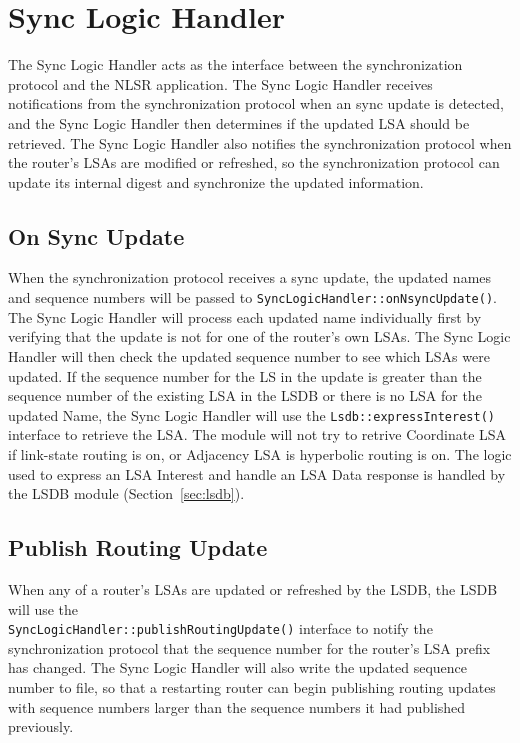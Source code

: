 \section{Sync Logic Handler}
\label{sec:sync-logic}

The Sync Logic Handler acts as the interface between the synchronization protocol and the NLSR application.
The Sync Logic Handler receives notifications from the synchronization protocol when an sync update is detected, and the Sync Logic Handler then determines if the updated LSA should be retrieved.
The Sync Logic Handler also notifies the synchronization protocol when the router's LSAs are modified or refreshed, so the synchronization protocol can update its internal digest and synchronize the updated information.

\subsection{On Sync Update}
When the synchronization protocol receives a sync update, the updated names and sequence numbers will be passed to \texttt{SyncLogicHandler::onNsyncUpdate()}.
The Sync Logic Handler will process each updated name individually first by verifying that the update is not for one of the router's own LSAs.
The Sync Logic Handler will then check the updated sequence number to see which LSAs were updated.
If the sequence number for the LS in the update is greater than the sequence number of the existing LSA in the LSDB or there is no LSA for the updated Name,
the Sync Logic Handler will use the \texttt{Lsdb::expressInterest()} interface to retrieve the LSA. The module will not try to retrive Coordinate LSA if link-state routing is on, or Adjacency LSA is hyperbolic routing is on.
The logic used to express an LSA Interest and handle an LSA Data response is handled by the LSDB module (Section~\ref{sec:lsdb}).

\subsection{Publish Routing Update}
\label{sssec:routing-update}
When any of a router's LSAs are updated or refreshed by the LSDB, the LSDB will use the \\ \texttt{SyncLogicHandler::publishRoutingUpdate()} interface to notify the synchronization protocol that the sequence number for the router's LSA prefix has changed.
The Sync Logic Handler will also write the updated sequence number to file, so that a restarting router can begin publishing routing updates with sequence numbers larger than the sequence numbers it had published previously.
